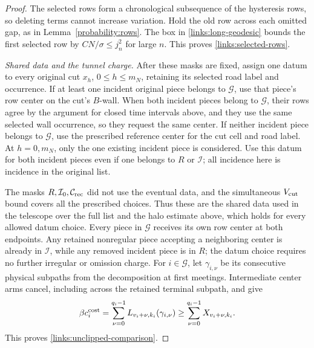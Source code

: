 \begin{proof}
The selected rows form a chronological subsequence of the hysteresis
rows, so deleting terms cannot increase variation. Hold the old row
across each omitted gap, as in Lemma~\ref{probability:rows}. The box
in \eqref{links:long-geodesic} bounds the first selected row by
\(CN/\sigma\le j_n^2\) for large \(n\). This proves
\eqref{links:selected-rows}.

\emph{Shared data and the tunnel charge.}
After these masks are fixed, assign one datum to every original cut
\(x_h\), \(0\le h\le m_N\), retaining its selected road label and
occurrence. If at least one incident original piece belongs to
\(\mathcal G\), use that piece's row center on the cut's \(B\)-wall.
When both incident pieces belong to \(\mathcal G\), their rows agree
by the argument for closed time intervals above, and they use the same
selected wall occurrence, so they request the same center. If neither
incident piece belongs to \(\mathcal G\), use the prescribed reference
center for the cut cell and road label.
At \(h=0,m_N\), only the one existing incident piece is considered.
Use this datum for both incident pieces even if one belongs to \(R\)
or \(\mathcal I\); all incidence here is incidence in the original
list.

The masks \(R,\mathcal I_0,\mathcal C_{\rm rec}\) did not use the
eventual data, and the simultaneous \(V_{\rm cut}\) bound covers all
the prescribed choices. Thus these are the shared data used in the
telescope over the full list and the halo estimate above, which holds
for every allowed datum choice. Every piece in \(\mathcal G\) receives
its own row center at both endpoints. Any retained nonregular piece
accepting a neighboring center is already in
\(\mathcal I\), while any removed incident piece is in \(R\);
the datum choice requires no further irregular or omission charge.
For \(i\in\mathcal G\), let \(\gamma_{i,\nu}\) be its consecutive physical
subpaths from the decomposition at first meetings. Intermediate center arms
cancel, including across the retained terminal subpath, and give
\[
 \beta c_i^{\rm cost}
 =\sum_{\nu=0}^{q_i-1}
     L_{v_i+\nu,k_i}(\gamma_{i,\nu})
 \ge\sum_{\nu=0}^{q_i-1}X_{v_i+\nu,k_i}.
\]
This proves \eqref{links:unclipped-comparison}.


\end{proof}
